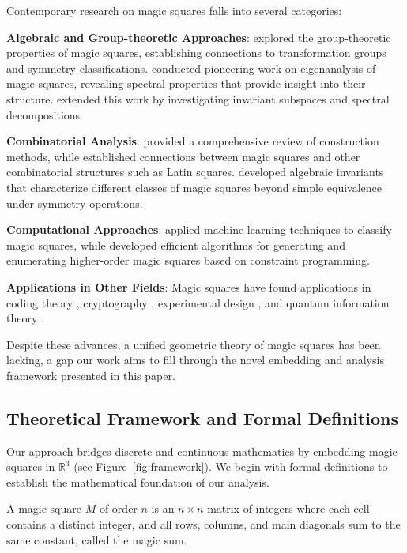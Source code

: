 Contemporary research on magic squares falls into several categories:

\textbf{Algebraic and Group-theoretic Approaches}: \citet{mattingly2000} explored the group-theoretic properties of magic squares, establishing connections to transformation groups and symmetry classifications. \citet{loly2007} conducted pioneering work on eigenanalysis of magic squares, revealing spectral properties that provide insight into their structure. \citet{walter2012} extended this work by investigating invariant subspaces and spectral decompositions.

\textbf{Combinatorial Analysis}: \citet{ahmed2004construction} provided a comprehensive review of construction methods, while \citet{xin2019} established connections between magic squares and other combinatorial structures such as Latin squares. \citet{nordgren2011} developed algebraic invariants that characterize different classes of magic squares beyond simple equivalence under symmetry operations.

\textbf{Computational Approaches}: \citet{bellew2015} applied machine learning techniques to classify magic squares, while \citet{chen2018} developed efficient algorithms for generating and enumerating higher-order magic squares based on constraint programming.

\textbf{Applications in Other Fields}: Magic squares have found applications in coding theory \citep{drisko1997}, cryptography \citep{sastry2013}, experimental design \citep{bailey2017combinatorics}, and quantum information theory \citep{goyeneche2020}.

Despite these advances, a unified geometric theory of magic squares has been lacking, a gap our work aims to fill through the novel embedding and analysis framework presented in this paper.

\subsection{Theoretical Framework and Formal Definitions}
\label{sec:framework}

Our approach bridges discrete and continuous mathematics by embedding magic squares in $\mathbb{R}^3$ (see Figure~\ref{fig:framework}). We begin with formal definitions to establish the mathematical foundation of our analysis.

\begin{definition}
A magic square $M$ of order $n$ is an $n \times n$ matrix of integers where each cell contains a distinct integer, and all rows, columns, and main diagonals sum to the same constant, called the magic sum.
\end{definition}

